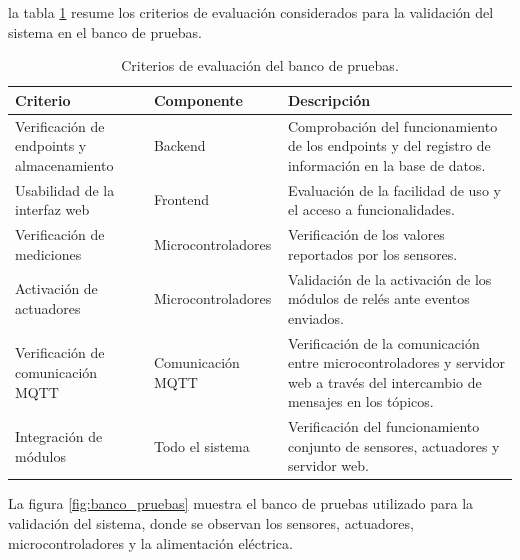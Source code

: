 la tabla \ref{tab:criterios_evaluacion} resume los criterios de evaluación
considerados para la validación del sistema en el banco de pruebas.

\begin{table}[H]
    \centering
    \caption[Criterios de evaluación del banco de pruebas]{Criterios de evaluación del banco de pruebas.}
    \begin{tabular}{p{3.4cm}p{3cm}p{6cm}}
        \hline
        \textbf{Criterio}                          & \textbf{Componente} & \textbf{Descripción}                                                                                                         \\
        \hline
        Verificación de endpoints y almacenamiento & Backend             & Comprobación del funcionamiento de los endpoints y del registro de información en la base de datos.                          \\
        \hline
        Usabilidad de la interfaz web              & Frontend            & Evaluación de la facilidad de uso y el acceso a funcionalidades.                                                             \\
        \hline
        Verificación de mediciones                 & Microcontroladores  & Verificación de los valores reportados por los sensores.                                                                     \\
        \hline
        Activación de actuadores                   & Microcontroladores  & Validación de la activación de los módulos de relés ante eventos enviados.                                                   \\
        \hline
        Verificación de comunicación MQTT          & Comunicación MQTT   & Verificación de la comunicación entre microcontroladores y servidor web a través del intercambio de mensajes en los tópicos. \\
        \hline
        Integración de módulos                     & Todo el sistema     & Verificación del funcionamiento conjunto de sensores, actuadores y servidor web.                                             \\
        \hline
    \end{tabular}
    \label{tab:criterios_evaluacion}
\end{table}

La figura \ref{fig:banco_pruebas} muestra el banco de pruebas utilizado para la
validación del sistema, donde se observan los sensores, actuadores,
microcontroladores y la alimentación eléctrica.

